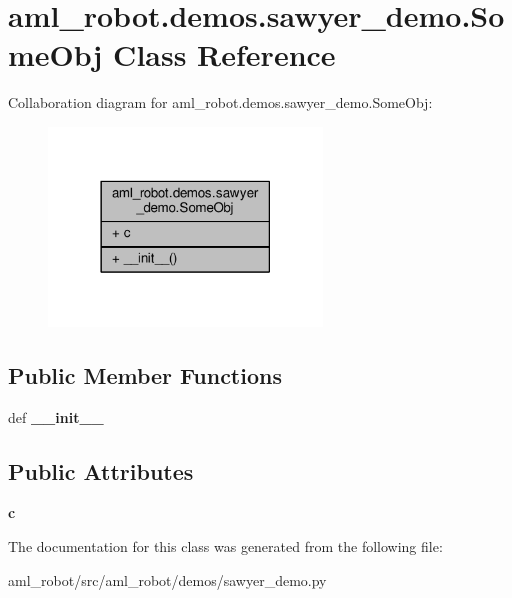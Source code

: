 \hypertarget{classaml__robot_1_1demos_1_1sawyer__demo_1_1_some_obj}{\section{aml\-\_\-robot.\-demos.\-sawyer\-\_\-demo.\-Some\-Obj Class Reference}
\label{classaml__robot_1_1demos_1_1sawyer__demo_1_1_some_obj}
}


Collaboration diagram for aml\-\_\-robot.\-demos.\-sawyer\-\_\-demo.\-Some\-Obj\-:\nopagebreak
\begin{figure}[H]
\begin{center}
\leavevmode
\includegraphics[width=206pt]{classaml__robot_1_1demos_1_1sawyer__demo_1_1_some_obj__coll__graph}
\end{center}
\end{figure}
\subsection*{Public Member Functions}
\begin{DoxyCompactItemize}
\item 
\hypertarget{classaml__robot_1_1demos_1_1sawyer__demo_1_1_some_obj_a752261be6cef1ccbce7d204ce0898354}{def {\bfseries \-\_\-\-\_\-init\-\_\-\-\_\-}}\label{classaml__robot_1_1demos_1_1sawyer__demo_1_1_some_obj_a752261be6cef1ccbce7d204ce0898354}

\end{DoxyCompactItemize}
\subsection*{Public Attributes}
\begin{DoxyCompactItemize}
\item 
\hypertarget{classaml__robot_1_1demos_1_1sawyer__demo_1_1_some_obj_a3531804107f87308db0d2d26712861bb}{{\bfseries c}}\label{classaml__robot_1_1demos_1_1sawyer__demo_1_1_some_obj_a3531804107f87308db0d2d26712861bb}

\end{DoxyCompactItemize}


The documentation for this class was generated from the following file\-:\begin{DoxyCompactItemize}
\item 
aml\-\_\-robot/src/aml\-\_\-robot/demos/sawyer\-\_\-demo.\-py\end{DoxyCompactItemize}

